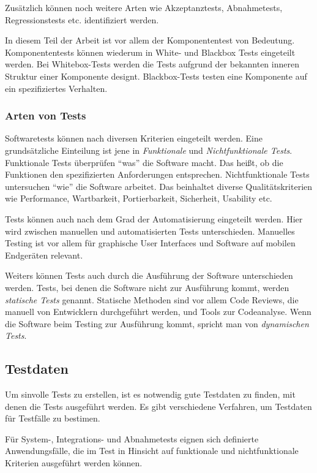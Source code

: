 Zusätzlich können noch weitere Arten wie Akzeptanztests, Abnahmetests, Regressionstests etc. identifiziert werden.

In diesem Teil der Arbeit ist vor allem der Komponententest von Bedeutung. Komponententests können wiederum in White- und Blackbox Tests eingeteilt werden. Bei Whitebox-Tests werden die Tests aufgrund der bekannten inneren Struktur einer Komponente designt. Blackbox-Tests testen eine Komponente auf ein spezifiziertes Verhalten.


\subsubsection{Arten von Tests}

Softwaretests können nach diversen Kriterien eingeteilt werden. Eine grundsätzliche Einteilung ist jene in \emph{Funktionale} und \emph{Nichtfunktionale Tests}. Funktionale Tests überprüfen ``was'' die Software macht. Das heißt, ob die Funktionen den spezifizierten Anforderungen entsprechen. Nichtfunktionale Tests untersuchen ``wie'' die Software arbeitet. Das beinhaltet diverse Qualitätskriterien wie Performance, Wartbarkeit, Portierbarkeit, Sicherheit, Usability etc.

Tests können auch nach dem Grad der Automatisierung eingeteilt werden. Hier wird zwischen manuellen und automatisierten Tests unterschieden. Manuelles Testing ist vor allem für graphische User Interfaces und Software auf mobilen Endgeräten relevant.

Weiters können Tests auch durch die Ausführung der Software unterschieden werden. Tests, bei denen die Software nicht zur Ausführung kommt, werden \emph{statische Tests} genannt. Statische Methoden sind vor allem Code Reviews, die manuell von Entwicklern durchgeführt werden, und Tools zur Codeanalyse. Wenn die Software beim Testing zur Ausführung kommt, spricht man von \emph{dynamischen Tests}.



\subsection{Testdaten}

Um sinvolle Tests zu erstellen, ist es notwendig gute Testdaten zu finden, mit denen die Tests ausgeführt werden. Es gibt verschiedene Verfahren, um Testdaten für Testfälle zu bestimen.

Für System-, Integrations- und Abnahmetests eignen sich definierte Anwendungsfälle, die im Test in Hinsicht auf funktionale und nichtfunktionale Kriterien ausgeführt werden können.

